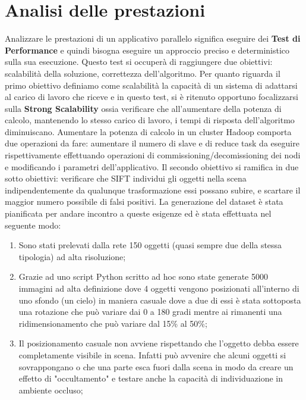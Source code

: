 \section{Analisi delle prestazioni}
Analizzare le prestazioni di un applicativo parallelo significa eseguire dei \textbf{Test di Performance} e quindi bisogna eseguire un approccio preciso e deterministico sulla sua esecuzione. Questo test si occuperà di raggiungere due obiettivi: scalabilità della soluzione, correttezza dell'algoritmo. Per quanto riguarda il primo obiettivo definiamo come scalabilità la capacità di un sistema di adattarsi al carico di lavoro che riceve e in questo test, si è ritenuto opportuno focalizzarsi sulla \textbf{Strong Scalability} ossia verificare che all'aumentare della potenza di calcolo, mantenendo lo stesso carico di lavoro, i tempi di risposta dell'algoritmo diminuiscano. Aumentare la potenza di calcolo in un cluster Hadoop comporta due operazioni da fare: aumentare il numero di slave e di reduce task da eseguire rispettivamente effettuando operazioni di commissioning/decomissioning dei nodi e modificando i parametri dell'applicativo. Il secondo obiettivo si ramifica in due sotto obiettivi: verificare che SIFT individui gli oggetti nella scena indipendentemente da qualunque trasformazione essi possano subire, e scartare il maggior numero possibile di falsi positivi. La generazione del dataset è stata pianificata per andare incontro a queste esigenze ed è stata effettuata nel seguente modo:
\begin{enumerate}
\item Sono stati prelevati dalla rete 150 oggetti (quasi sempre due della stessa tipologia) ad alta risoluzione;
\item Grazie ad uno script Python scritto ad hoc sono state generate 5000 immagini ad alta definizione dove 4 oggetti vengono posizionati all'interno di uno sfondo (un cielo) in maniera casuale dove a due di essi è stata sottoposta una rotazione che può variare dai 0 a 180 gradi mentre ai rimanenti una ridimensionamento che può variare dal 15\% al 50\%;
\item Il posizionamento casuale non avviene rispettando che l'oggetto debba essere completamente visibile in scena. Infatti può avvenire che alcuni oggetti si sovrappongano o che una parte esca fuori dalla scena in modo da creare un effetto di "occultamento" e testare anche la capacità di individuazione in ambiente occluso;
\end{enumerate}
